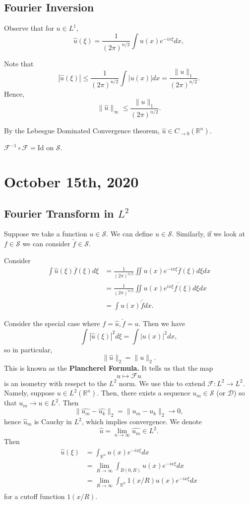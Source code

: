 \documentclass[12pt]{scrartcl}
\newcommand{\R}{\mathbb{R}}
\renewcommand{\hat}{\widehat}
\begin{document}
\subsection{Fourier Inversion}
Observe that for $u \in L^1$, 
$$\hat{u}(\xi) = \frac{1}{(2\pi)^{n/2}} \int u(x)e^{-ix\xi}dx,$$

Note that 
$$|\hat{u}(\xi)| \le \frac{1}{(2\pi)^{n/2}} \int |u(x)|dx = \frac{\|u\|_1}{(2\pi)^{n/2}}.$$
Hence,
$$\|\hat{u}\|_{\infty} \le \frac{\|u\|_1}{(2\pi)^{n/2}}.$$

By the Lebesgue Dominated Convergence theorem, $\hat{u} \in C_{\to 0}(\R^n)$.

\begin{exercise} $\mathcal F^{-1} \circ \mathcal F = \text{Id}$ on $\mathcal S$.
\end{exercise}
\pagebreak
\section{October 15th, 2020}
\subsection{Fourier Transform in $L^2$}
Suppose we take a function $u \in \mathcal S$.  We can define $\hat{u} \in \mathcal S$.  Similarly, if we look at $f \in \mathcal S$ we can consider $\check{f} \in \mathcal S$.

Consider 
\begin{align*}
\int \hat{u}(\xi) \overline{f}(\xi)d\xi &= \frac{1}{(2\pi)^{n/2}} \iint u(x)e^{-ix\xi}\overline{f}(\xi)d\xi dx \\
&= \frac{1}{(2\pi)^{n/2}} \iint u(x) \overline{e^{ix\xi}f(\xi)} d\xi dx\\
&= \int u(x) \overline{\check{f}}dx.
\end{align*}

Consider the special case where $f = \hat{u}, \check{f} = u$.  Then we have 
$$\int |\hat{u}(\xi)|^2 d\xi = \int |u(x)|^2dx,$$
so in particular,
$$\|\hat{u}\|_2 = \|u\|_2.$$
This is known as the\textbf{ Plancherel Formula.} It tells us that the map
$$u \mapsto \mathcal F u$$
is an isometry with resepct to the $L^2$ norm.  We use this to extend $\mathcal F : L^2 \to L^2$.  Namely, suppose $u \in L^2(\R^n)$.  Then, there exists a sequence $u_m \in \mathcal S$ (or $\mathcal D$) so that $u_m \to u \in L^2$.  
Then 
$$\| \hat{u_m} - \hat{u_k}\|_2 = \|u_m - u_k \|_2 \rightarrow 0,$$
hence $\hat{u}_m$ is Cauchy in $L^2$, which implies convergence.  We denote 
$$\hat{u} = \lim_{n \to \infty} \hat{u_m} \in L^2.$$
Then
\begin{align*}
\hat{u}(\xi) &= \int_{\R^n} u(x) e^{-ix\xi}dx \\
&= \lim_{R \to \infty} \int_{B(0, R)} u(x)e^{-ix\xi}dx \\
&= \lim_{R \to \infty} \int_{\R^n} 1(x/R)u(x)e^{-ix\xi}dx\\
\end{align*}
for a cutoff function $1(x/R)$.
\end{document}
